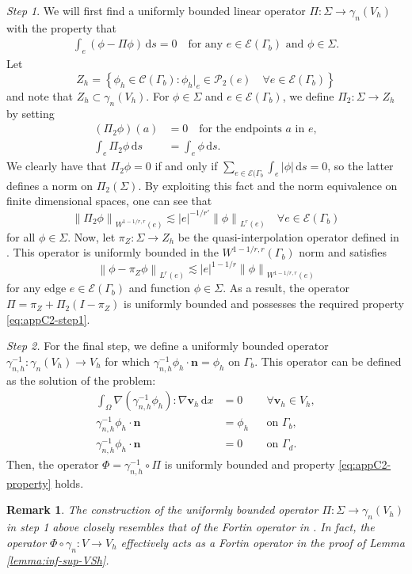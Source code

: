 \documentclass[onefignum,onetabnum]{siamart190516}
\newcommand{\bn}{\boldsymbol{n}}
\newcommand{\bv}{\boldsymbol{v}}
\newcommand{\dd}{\mathrm{d}}
\newcommand{\nrm}[1]{\left\lVert#1\right\rVert}
\newcommand{\Cc}{\mathcal{C}}
\newcommand{\Ec}{\mathcal{E}}
\newcommand{\Pc}{\mathcal{P}}
\newtheorem{remark}[theorem]{Remark}
\begin{document}
\textit{Step 1}. We will first find a uniformly bounded linear operator $\Pi:\Sigma\to \gamma_n(V_h)$ with the property that 
%
\begin{align}\label{eq:appC2-step1}
	\int_e (\phi - \Pi\phi)\,\dd s = 0 \quad \text{for any $e\in\Ec(\Gamma_b)$ and $\phi\in \Sigma$.}
\end{align}
%
Let 
%
\[
	Z_h = \left\lbrace \phi_h\in \Cc(\Gamma_b) : \phi_h|_e \in \Pc_2(e) \quad \forall e\in\Ec(\Gamma_b) \right\rbrace
\]
%
and note that $Z_h \subset \gamma_n(V_h)$. For $\phi\in\Sigma$ and $e\in\Ec(\Gamma_b)$, we define $\Pi_2:\Sigma\to Z_h$ by setting  
%
\begin{align*}
	(\Pi_2\phi)(a) &= 0  \quad \text{for the endpoints $a$ in $e$},\\
	\int_e \Pi_2\phi\,\dd s &= \int_e\phi\,\dd s.
\end{align*}
%
We clearly have that $\Pi_2\phi = 0 $ if and only if $\sum_{e\in\Ec(\Gamma_b} \int_e |\phi|\,\dd s = 0$, so the latter defines a norm on $\Pi_2(\Sigma)$. By exploiting this fact and the norm equivalence on finite dimensional spaces, one can see that 
%
\[
	\nrm{\Pi_2\phi}_{W^{1-1/r,r}(e)}\lesssim |e|^{-1/r'} \nrm{\phi}_{L^r(e)} \quad \forall e\in\Ec(\Gamma_b)
\]
%
for all $\phi\in\Sigma$. Now, let $\pi_{Z}:\Sigma\to Z_h$ be the quasi-interpolation operator defined in \cite{ern2017}. This operator is uniformly bounded in the $W^{1-1/r,r}(\Gamma_b)$ norm and satisfies 
%
\[
	\nrm{\phi - \pi_Z\phi}_{L^r(e)}\lesssim |e|^{1-1/r} \nrm{\phi}_{W^{1-1/r,r}(e)}
\]
%	 
for any edge $e\in \Ec(\Gamma_b)$ and function $\phi\in \Sigma$. As a result, the operator $\Pi = \pi_Z + \Pi_2(I-\pi_Z)$ is uniformly bounded and possesses the required property \eqref{eq:appC2-step1}.

\textit{Step 2.} For the final step, we define a uniformly bounded operator $\gamma_{n,h}^{-1}:\gamma_n(V_h) \to V_h$ for which $\gamma_{n,h}^{-1}\phi_h\cdot\bn = \phi_h$ on $\Gamma_b$. This operator can be defined as the solution of the problem:
%
\begin{align*}
	\int_\Omega \nabla (\gamma_{n,h}^{-1}\phi_h) : \nabla\bv_h\,\dd x &= 0 && \forall \bv_h\in V_h,\\
	\gamma_{n,h}^{-1}\phi_h\cdot\bn &= \phi_h && \text{on $\Gamma_b$}, \\
	\gamma_{n,h}^{-1}\phi_h\cdot\bn &= 0 && \text{on $\Gamma_d$}.
\end{align*}
%
Then, the operator $\Phi = \gamma_{n,h}^{-1} \circ \Pi$ is uniformly bounded and property \eqref{eq:appC2-property} holds.

\begin{remark}
	The construction of the uniformly bounded operator $\Pi:\Sigma\to \gamma_n(V_h)$ in step 1 above closely resembles that of the Fortin operator in \cite[Proposition 8.4.3]{boffi2013}. In fact, the operator $\Phi \circ \gamma_n: V \to V_h$ effectively acts as a Fortin operator in the proof of Lemma \ref{lemma:inf-sup-VSh}.
\end{remark}







\end{document}
